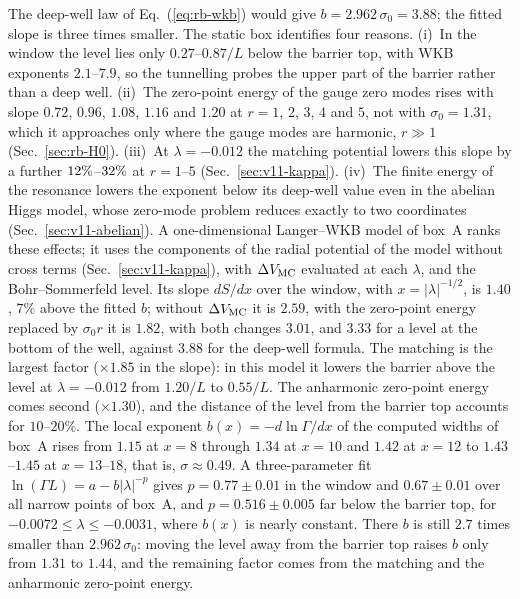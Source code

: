The deep-well law of Eq.~(\ref{eq:rb-wkb}) would give $b=2.962\,\sigma_0=3.88$; the fitted slope is three times smaller. %
The static box identifies four reasons.
(i)~In the window the level lies only $0.27$--$0.87/L$ below the barrier top, with WKB exponents $2.1$--$7.9$, so the tunnelling probes the upper part of the barrier rather than a deep well. %
(ii)~The zero-point energy of the gauge zero modes rises with slope $0.72$, $0.96$, $1.08$, $1.16$ and $1.20$ at $r=1$, $2$, $3$, $4$ and $5$, not with $\sigma_0=1.31$, which it approaches only where the gauge modes are harmonic, $r\gg1$ (Sec.~\ref{sec:rb-H0}). %
(iii)~At $\lambda=-0.012$ the matching potential lowers this slope by a further $12\%$--$32\%$ at $r=1$--$5$ (Sec.~\ref{sec:v11-kappa}). %
(iv)~The finite energy of the resonance lowers the exponent below its deep-well value even in the abelian Higgs model, whose zero-mode problem reduces exactly to two coordinates (Sec.~\ref{sec:v11-abelian}).
A one-dimensional Langer--WKB model of box~A ranks these effects; it uses the components of the radial potential of the model without cross terms (Sec.~\ref{sec:v11-kappa}), with $\Delta V_{\rm MC}$ evaluated at each $\lambda$, and the Bohr--Sommerfeld level. %
Its slope $dS/dx$ over the window, with $x=|\lambda|^{-1/2}$, is $1.40$, $7\%$ above the fitted $b$; without $\Delta V_{\rm MC}$ it is $2.59$, with the zero-point energy replaced by $\sigma_0r$ it is $1.82$, with both changes $3.01$, and $3.33$ for a level at the bottom of the well, against $3.88$ for the deep-well formula. %
The matching is the largest factor ($\times1.85$ in the slope): in this model it lowers the barrier above the level at $\lambda=-0.012$ from $1.20/L$ to $0.55/L$. %
The anharmonic zero-point energy comes second ($\times1.30$), and the distance of the level from the barrier top accounts for $10$--$20\%$. %
The local exponent $b(x)=-d\ln\Gamma/dx$ of the computed widths of box~A rises from $1.15$ at $x=8$ through $1.34$ at $x=10$ and $1.42$ at $x=12$ to $1.43$--$1.45$ at $x=13$--$18$, that is, $\sigma\approx0.49$. %
A three-parameter fit $\ln(\Gamma L)=a-b|\lambda|^{-p}$ gives $p=0.77\pm0.01$ in the window and $0.67\pm0.01$ over all narrow points of box~A, and $p=0.516\pm0.005$ far below the barrier top, for $-0.0072\le\lambda\le-0.0031$, where $b(x)$ is nearly constant. %
There $b$ is still $2.7$ times smaller than $2.962\,\sigma_0$: moving the level away from the barrier top raises $b$ only from $1.31$ to $1.44$, and the remaining factor comes from the matching and the anharmonic zero-point energy. %


